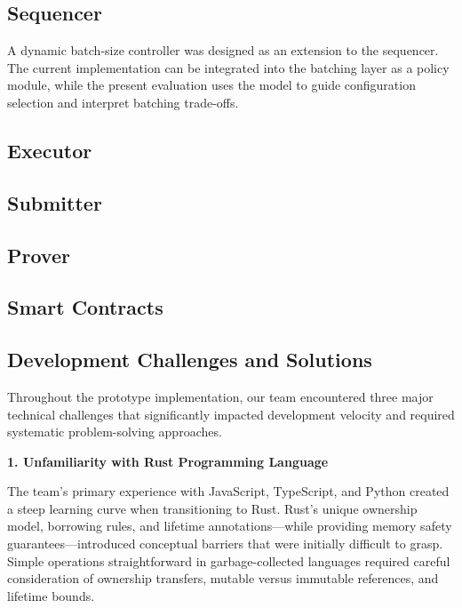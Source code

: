 \subsection{Sequencer}
A dynamic batch-size controller was designed as an extension to the sequencer. The current implementation can be integrated into the batching layer as a policy module, while the present evaluation uses the model to guide configuration selection and interpret batching trade-offs.


\subsection{Executor}


\subsection{Submitter}


\subsection{Prover}


\subsection{Smart Contracts}



\subsection{Development Challenges and Solutions}

Throughout the prototype implementation, our team encountered three major technical challenges that significantly impacted development velocity and required systematic problem-solving approaches.

\textbf{1. Unfamiliarity with Rust Programming Language}

The team's primary experience with JavaScript, TypeScript, and Python created a steep learning curve when transitioning to Rust. Rust's unique ownership model, borrowing rules, and lifetime annotations—while providing memory safety guarantees—introduced conceptual barriers that were initially difficult to grasp. Simple operations straightforward in garbage-collected languages required careful consideration of ownership transfers, mutable versus immutable references, and lifetime bounds.

